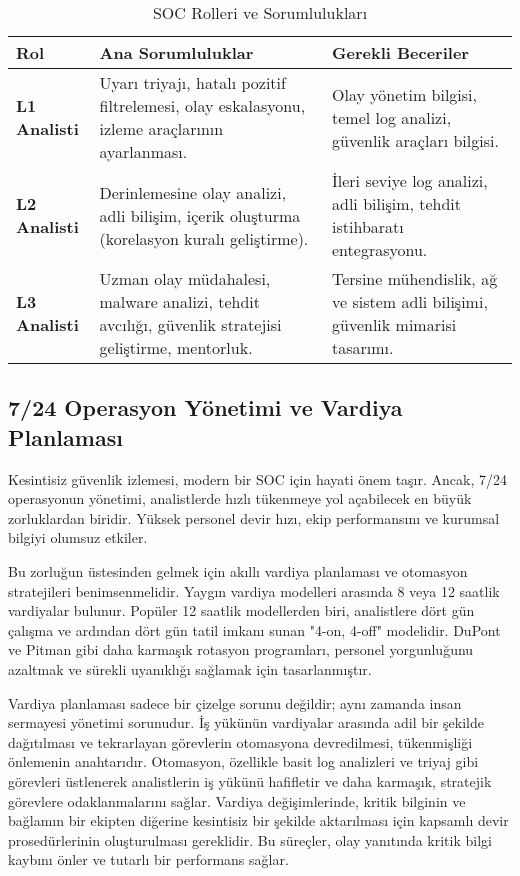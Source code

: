 \begin{table}[htbp]
\caption{SOC Rolleri ve Sorumlulukları}
\begin{tabularx}{\textwidth}{|X|X|X|}
\hline
\textbf{Rol} & \textbf{Ana Sorumluluklar} & \textbf{Gerekli Beceriler}  \\
\hline
\textbf{L1 Analisti} & Uyarı triyajı, hatalı pozitif filtrelemesi, olay eskalasyonu, izleme araçlarının ayarlanması. & Olay yönetim bilgisi, temel log analizi, güvenlik araçları bilgisi.  \\
\hline
\textbf{L2 Analisti} & Derinlemesine olay analizi, adli bilişim, içerik oluşturma (korelasyon kuralı geliştirme). & İleri seviye log analizi, adli bilişim, tehdit istihbaratı entegrasyonu.  \\
\hline
\textbf{L3 Analisti} & Uzman olay müdahalesi, malware analizi, tehdit avcılığı, güvenlik stratejisi geliştirme, mentorluk. & Tersine mühendislik, ağ ve sistem adli bilişimi, güvenlik mimarisi tasarımı.  \\
\hline
\end{tabularx}
\end{table}

\subsection{7/24 Operasyon Yönetimi ve Vardiya Planlaması}

Kesintisiz güvenlik izlemesi, modern bir SOC için hayati önem taşır. Ancak, 7/24 operasyonun yönetimi, analistlerde hızlı tükenmeye yol açabilecek en büyük zorluklardan biridir. Yüksek personel devir hızı, ekip performansını ve kurumsal bilgiyi olumsuz etkiler.

Bu zorluğun üstesinden gelmek için akıllı vardiya planlaması ve otomasyon stratejileri benimsenmelidir. Yaygın vardiya modelleri arasında 8 veya 12 saatlik vardiyalar bulunur. Popüler 12 saatlik modellerden biri, analistlere dört gün çalışma ve ardından dört gün tatil imkanı sunan "4-on, 4-off" modelidir. DuPont ve Pitman gibi daha karmaşık rotasyon programları, personel yorgunluğunu azaltmak ve sürekli uyanıklığı sağlamak için tasarlanmıştır.

Vardiya planlaması sadece bir çizelge sorunu değildir; aynı zamanda insan sermayesi yönetimi sorunudur. İş yükünün vardiyalar arasında adil bir şekilde dağıtılması ve tekrarlayan görevlerin otomasyona devredilmesi, tükenmişliği önlemenin anahtarıdır. Otomasyon, özellikle basit log analizleri ve triyaj gibi görevleri üstlenerek analistlerin iş yükünü hafifletir ve daha karmaşık, stratejik görevlere odaklanmalarını sağlar. Vardiya değişimlerinde, kritik bilginin ve bağlamın bir ekipten diğerine kesintisiz bir şekilde aktarılması için kapsamlı devir prosedürlerinin oluşturulması gereklidir. Bu süreçler, olay yanıtında kritik bilgi kaybını önler ve tutarlı bir performans sağlar.

